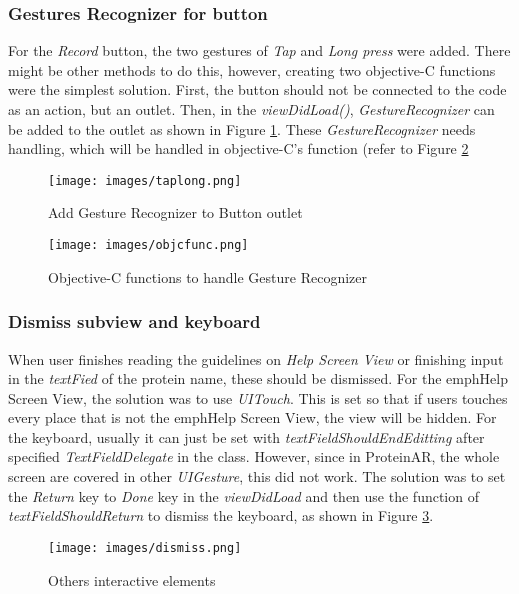 \subsubsection{Gestures Recognizer for button}
For the \emph{Record} button, the two gestures of \emph{Tap} and \emph{Long press} were added. There might be other methods to do this, however, creating two objective-C functions were the simplest solution. First, the button should not be connected to the code as an action, but an outlet. Then, in the \emph{viewDidLoad()}, \emph{GestureRecognizer} can be added to the outlet as shown in Figure \ref{fig:taplong}. These \emph{GestureRecognizer} needs handling, which will be handled in objective-C’s function (refer to Figure \ref{fig:objcfunc}
\begin{figure}[!htp]
	\centering
	\texttt{[image: images/taplong.png]}
	\caption{Add Gesture Recognizer to Button outlet}
	\label{fig:taplong}
\end{figure}
\begin{figure}[!htp]
	\centering
	\texttt{[image: images/objcfunc.png]}
	\caption{Objective-C functions to handle Gesture Recognizer}
	\label{fig:objcfunc}
\end{figure}

\subsubsection{Dismiss subview and keyboard}
When user finishes reading the guidelines on \emph{Help Screen View} or finishing input in the \emph{textFied} of the protein name, these should be dismissed. For the emph{Help Screen View}, the solution was to use \emph{UITouch}. This is set so that if users touches every place that is not the emph{Help Screen View}, the view will be hidden. 
For the keyboard, usually it can just be set with \emph{textFieldShouldEndEditting} after specified \emph{TextFieldDelegate} in the class. However, since in ProteinAR, the whole screen are covered in other \emph{UIGesture}, this did not work. The solution was to set the \emph{Return} key to \emph{Done} key in the \emph{viewDidLoad} and then use the function of \emph{textFieldShouldReturn} to dismiss the keyboard, as shown in Figure \ref{fig:dismiss}.

\begin{figure}[!htp]
	\centering
	\texttt{[image: images/dismiss.png]}
	\caption{Others interactive elements}
	\label{fig:dismiss}
\end{figure}

